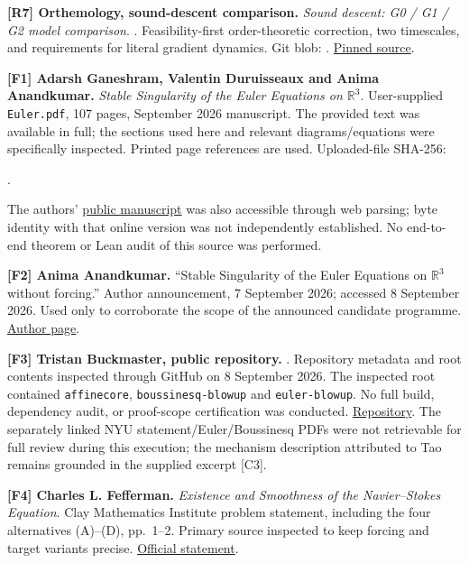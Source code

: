\documentclass[11pt,a4paper]{article}
\begin{document}
\textbf{{[}R7{]} Orthemology, sound-descent comparison.} \emph{Sound
descent: G0 / G1 / G2 model comparison}.
.
Feasibility-first order-theoretic correction, two timescales, and
requirements for literal gradient dynamics. Git blob:
.
\href{https://github.com/theislampill/orthemology/blob/f50dc1aee52356cc6adbef342387576b02afc124/applications/daee-epistemics/SOUND-DESCENT-MODEL-COMPARISON.md}{Pinned
source}.

\textbf{{[}F1{]} Adarsh Ganeshram, Valentin Duruisseaux and Anima
Anandkumar.} \emph{Stable Singularity of the Euler Equations on
\(\mathbb R^3\)}. User-supplied \texttt{Euler.pdf}, 107 pages, September
2026 manuscript. The provided text was available in full; the sections
used here and relevant diagrams/equations were specifically inspected.
Printed page references are used. Uploaded-file SHA-256:

.

The authors'
\href{https://anima-ai.org/wp-content/uploads/2026/09/Euler.pdf}{public
manuscript} was also accessible through web parsing; byte identity with
that online version was not independently established. No end-to-end
theorem or Lean audit of this source was performed.

\textbf{{[}F2{]} Anima Anandkumar.} ``Stable Singularity of the Euler
Equations on \(\mathbb R^3\) without forcing.'' Author announcement, 7
September 2026; accessed 8 September 2026. Used only to corroborate the
scope of the announced candidate programme.
\href{https://anima-ai.org/2026/09/07/stable-singularity-of-the-euler-equations-on-r3-without-forcing/}{Author
page}.

\textbf{{[}F3{]} Tristan Buckmaster, public repository.}
. Repository metadata and root
contents inspected through GitHub on 8 September 2026. The inspected
root contained \texttt{affinecore}, \texttt{boussinesq-blowup} and
\texttt{euler-blowup}. No full build, dependency audit, or proof-scope
certification was conducted.
\href{https://github.com/tristanbuckmaster/fluid_lean}{Repository}. The
separately linked NYU statement/Euler/Boussinesq PDFs were not
retrievable for full review during this execution; the mechanism
description attributed to Tao remains grounded in the supplied excerpt
{[}C3{]}.

\textbf{{[}F4{]} Charles L. Fefferman.} \emph{Existence and Smoothness
of the Navier--Stokes Equation}. Clay Mathematics Institute problem
statement, including the four alternatives (A)--(D), pp.~1--2. Primary
source inspected to keep forcing and target variants precise.
\href{https://www.claymath.org/wp-content/uploads/2022/06/navierstokes.pdf}{Official
statement}.
\end{document}

